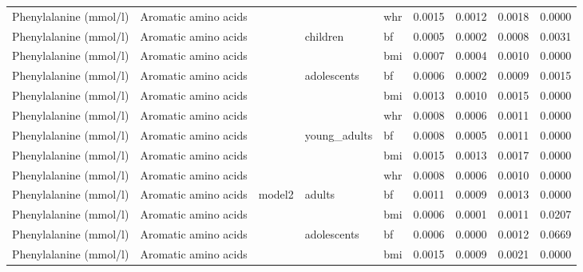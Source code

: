\documentclass[11pt,twoside]{bristolthesis}
\begin{document}
\begin{longtable}[t]{lllllrrrr}
\cmidrule{1-2}
\cmidrule{5-9}\nopagebreak
Phenylalanine (mmol/l) & Aromatic amino acids &  &  & whr & 0.0015 & 0.0012 & 0.0018 & 0.0000\\
\cmidrule{1-2}
\cmidrule{5-9}\nopagebreak
Phenylalanine (mmol/l) & Aromatic amino acids &  & \multirow{-3}{*}{\raggedright\arraybackslash children} & bf & 0.0005 & 0.0002 & 0.0008 & 0.0031\\
\cmidrule{1-2}
\cmidrule{4-9}\nopagebreak
Phenylalanine (mmol/l) & Aromatic amino acids &  &  & bmi & 0.0007 & 0.0004 & 0.0010 & 0.0000\\
\cmidrule{1-2}
\cmidrule{5-9}\nopagebreak
Phenylalanine (mmol/l) & Aromatic amino acids &  & \multirow{-2}{*}{\raggedright\arraybackslash adolescents} & bf & 0.0006 & 0.0002 & 0.0009 & 0.0015\\
\cmidrule{1-2}
\cmidrule{4-9}\nopagebreak
Phenylalanine (mmol/l) & Aromatic amino acids &  &  & bmi & 0.0013 & 0.0010 & 0.0015 & 0.0000\\
\cmidrule{1-2}
\cmidrule{5-9}\nopagebreak
Phenylalanine (mmol/l) & Aromatic amino acids &  &  & whr & 0.0008 & 0.0006 & 0.0011 & 0.0000\\
\cmidrule{1-2}
\cmidrule{5-9}\nopagebreak
Phenylalanine (mmol/l) & Aromatic amino acids &  & \multirow{-3}{*}{\raggedright\arraybackslash young\_adults} & bf & 0.0008 & 0.0005 & 0.0011 & 0.0000\\
\cmidrule{1-2}
\cmidrule{4-9}\nopagebreak
Phenylalanine (mmol/l) & Aromatic amino acids &  &  & bmi & 0.0015 & 0.0013 & 0.0017 & 0.0000\\
\cmidrule{1-2}
\cmidrule{5-9}\nopagebreak
Phenylalanine (mmol/l) & Aromatic amino acids &  &  & whr & 0.0008 & 0.0006 & 0.0010 & 0.0000\\
\cmidrule{1-2}
\cmidrule{5-9}\nopagebreak
Phenylalanine (mmol/l) & Aromatic amino acids & \multirow{-11}{*}{\raggedright\arraybackslash model2} & \multirow{-3}{*}{\raggedright\arraybackslash adults} & bf & 0.0011 & 0.0009 & 0.0013 & 0.0000\\
\cmidrule{1-9}\pagebreak[0]
Phenylalanine (mmol/l) & Aromatic amino acids &  &  & bmi & 0.0006 & 0.0001 & 0.0011 & 0.0207\\
\cmidrule{1-2}
\cmidrule{5-9}\nopagebreak
Phenylalanine (mmol/l) & Aromatic amino acids &  & \multirow{-2}{*}{\raggedright\arraybackslash adolescents} & bf & 0.0006 & 0.0000 & 0.0012 & 0.0669\\
\cmidrule{1-2}
\cmidrule{4-9}\nopagebreak
Phenylalanine (mmol/l) & Aromatic amino acids &  &  & bmi & 0.0015 & 0.0009 & 0.0021 & 0.0000\\

\end{longtable}
\end{document}

